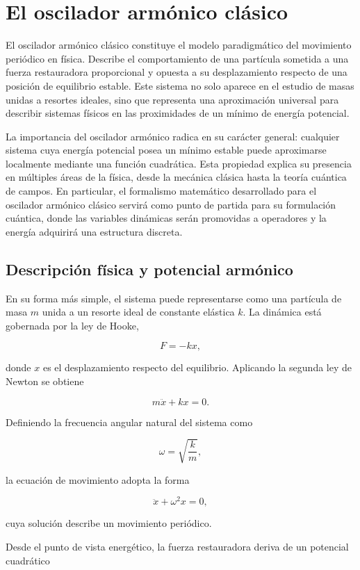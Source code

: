\documentclass[11pt,a4paper,spanish]{book}
\begin{document}
\section{El oscilador armónico clásico}
El oscilador armónico clásico constituye el modelo paradigmático del movimiento periódico en física. Describe el comportamiento de una partícula sometida a una fuerza restauradora proporcional y opuesta a su desplazamiento respecto de una posición de equilibrio estable. Este sistema no solo aparece en el estudio de masas unidas a resortes ideales, sino que representa una aproximación universal para describir sistemas físicos en las proximidades de un mínimo de energía potencial.

La importancia del oscilador armónico radica en su carácter general: cualquier sistema cuya energía potencial posea un mínimo estable puede aproximarse localmente mediante una función cuadrática. Esta propiedad explica su presencia en múltiples áreas de la física, desde la mecánica clásica hasta la teoría cuántica de campos. En particular, el formalismo matemático desarrollado para el oscilador armónico clásico servirá como punto de partida para su formulación cuántica, donde las variables dinámicas serán promovidas a operadores y la energía adquirirá una estructura discreta.

\subsection{Descripción física y potencial armónico}
En su forma más simple, el sistema puede representarse como una partícula de masa $m$ unida a un resorte ideal de constante elástica $k$. La dinámica está gobernada por la ley de Hooke,

\[
F = -kx,
\]

donde $x$ es el desplazamiento respecto del equilibrio. Aplicando la segunda ley de Newton se obtiene

\[
m\ddot{x} + kx = 0.
\]

Definiendo la frecuencia angular natural del sistema como

\[
\omega = \sqrt{\frac{k}{m}},
\]

la ecuación de movimiento adopta la forma

\[
\ddot{x} + \omega^2 x = 0,
\]

cuya solución describe un movimiento periódico.

Desde el punto de vista energético, la fuerza restauradora deriva de un potencial cuadrático
\end{document}
